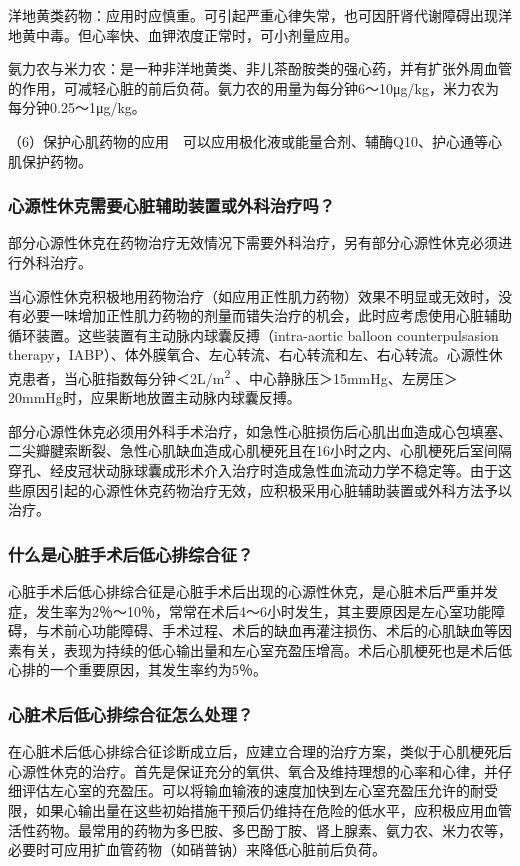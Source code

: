 洋地黄类药物：应用时应慎重。可引起严重心律失常，也可因肝肾代谢障碍出现洋地黄中毒。但心率快、血钾浓度正常时，可小剂量应用。

氨力农与米力农：是一种非洋地黄类、非儿茶酚胺类的强心药，并有扩张外周血管的作用，可减轻心脏的前后负荷。氨力农的用量为每分钟6～10μg/kg，米力农为每分钟0.25～1μg/kg。

（6）保护心肌药物的应用　可以应用极化液或能量合剂、辅酶Q10、护心通等心肌保护药物。

\subsubsection{心源性休克需要心脏辅助装置或外科治疗吗？}

部分心源性休克在药物治疗无效情况下需要外科治疗，另有部分心源性休克必须进行外科治疗。

当心源性休克积极地用药物治疗（如应用正性肌力药物）效果不明显或无效时，没有必要一味增加正性肌力药物的剂量而错失治疗的机会，此时应考虑使用心脏辅助循环装置。这些装置有主动脉内球囊反搏（intra-aortic
balloon counterpulsasion
therapy，IABP）、体外膜氧合、左心转流、右心转流和左、右心转流。心源性休克患者，当心脏指数每分钟＜2L/m\textsuperscript{2}
、中心静脉压＞15mmHg、左房压＞20mmHg时，应果断地放置主动脉内球囊反搏。

部分心源性休克必须用外科手术治疗，如急性心脏损伤后心肌出血造成心包填塞、二尖瓣腱索断裂、急性心肌缺血造成心肌梗死且在16小时之内、心肌梗死后室间隔穿孔、经皮冠状动脉球囊成形术介入治疗时造成急性血流动力学不稳定等。由于这些原因引起的心源性休克药物治疗无效，应积极采用心脏辅助装置或外科方法予以治疗。

\subsubsection{什么是心脏手术后低心排综合征？}

心脏手术后低心排综合征是心脏手术后出现的心源性休克，是心脏术后严重并发症，发生率为2％～10％，常常在术后4～6小时发生，其主要原因是左心室功能障碍，与术前心功能障碍、手术过程、术后的缺血再灌注损伤、术后的心肌缺血等因素有关，表现为持续的低心输出量和左心室充盈压增高。术后心肌梗死也是术后低心排的一个重要原因，其发生率约为5％。

\subsubsection{心脏术后低心排综合征怎么处理？}

在心脏术后低心排综合征诊断成立后，应建立合理的治疗方案，类似于心肌梗死后心源性休克的治疗。首先是保证充分的氧供、氧合及维持理想的心率和心律，并仔细评估左心室的充盈压。可以将输血输液的速度加快到左心室充盈压允许的耐受限，如果心输出量在这些初始措施干预后仍维持在危险的低水平，应积极应用血管活性药物。最常用的药物为多巴胺、多巴酚丁胺、肾上腺素、氨力农、米力农等，必要时可应用扩血管药物（如硝普钠）来降低心脏前后负荷。

